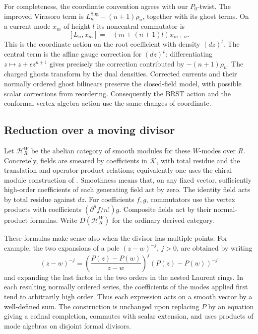\documentclass[11pt]{article}
\numberwithin{equation}{section}
\theoremstyle{definition}
\theoremstyle{remark}
\begin{document}
For completeness, the coordinate convention agrees with our
\(P_0\)-twist.  The improved Virasoro term is
\(L_n^{\mathrm{Sug}}-(n+1)\rho_n\), together with its ghost terms.
On a current mode \(x_m\) of height \(l\) its noncentral commutator is
\[
 [L_n,x_m]=-(m+(n+1)l)x_{m+n}.
\]
This is the coordinate action on the root coefficient with density
\((dz)^l\).  The central term is the affine gauge correction for
\((dz)^\rho\); differentiating \(z\mapsto z+\epsilon z^{n+1}\)
gives precisely the correction contributed by \(-(n+1)\rho_n\).
The charged ghosts transform by the dual densities.  Corrected
currents and their normally ordered ghost bilinears preserve the
closed-field model, with possible scalar corrections from reordering.
Consequently the BRST action and the conformal vertex-algebra action
use the same changes of coordinate.

\subsection{Reduction over a moving divisor}

Let \(\mathcal H_R^W\) be the abelian category of smooth modules for
these \(W\)-modes over \(R\).  Concretely, fields are smeared by
coefficients in \(\mathcal K\), with total residue and the translation
and operator-product relations; equivalently one uses the chiral
module construction of \cite[Section~3.6]{BDChiral}.  Smoothness means
that, on any fixed vector, sufficiently high-order coefficients of each generating field
act by zero.  The identity field acts by total residue against \(dz\).
For coefficients \(f,g\), commutators use the vertex products with
coefficients \((\partial^n f/n!)g\).  Composite fields act by their
normal-product formulas.  Write \(D(\mathcal H_R^W)\) for the ordinary
derived category.

These formulas make sense also when the divisor has multiple points.
For example, the two expansions of a pole \((z-w)^{-j}\), \(j>0\),
are obtained by writing
\[
 (z-w)^{-j}
 =\left(\frac{P(z)-P(w)}{z-w}\right)^j(P(z)-P(w))^{-j}
\]
and expanding the last factor in the two orders in the nested
Laurent rings.  In each resulting normally ordered series, the
coefficients of the modes applied first tend to arbitrarily high
order.  Thus each expression acts on a smooth vector by a well-defined
sum.  The construction is unchanged upon replacing \(P\) by an
equation giving a cofinal completion, commutes with scalar extension,
and uses products of mode algebras on disjoint formal divisors.
\end{document}
